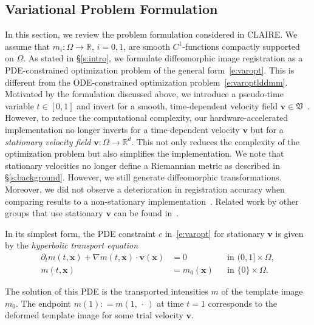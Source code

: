 \documentclass[11pt]{amsart}
\newcommand{\secref}[1]{\S\ref{#1}}
\newcommand\fs[1]{\ensuremath{\mathfrak{#1}}}
\newcommand\igrad{\ensuremath{\nabla}}
\newcommand{\defeq}{\ensuremath{\mathrel{\mathop:}=}}
\renewcommand{\vec}[1]{\ensuremath{\boldsymbol{#1}}}
\begin{document}
\subsection{Variational Problem Formulation}\label{s:formulation}

In this section, we review the problem formulation considered in CLAIRE. We assume that $m_i : \Omega \to \mathbb{R}$, $i=0,1$, are smooth $C^1$-functions compactly supported on $\Omega$. As stated in \secref{s:intro}, we formulate diffeomorphic image registration as a PDE-constrained optimization problem of the general form~\eqref{e:varopt}. This is different from the ODE-constrained optimization problem~\eqref{e:varoptlddmm}. Motivated by the formulation discussed above, we introduce a pseudo-time variable $t \in [0,1]$ and invert for a smooth, time-dependent velocity field $\vec{v} \in \fs{V}$~\cite{Mang:2015a}. However, to reduce the computational complexity, our hardware-accelerated implementation no longer inverts for a time-dependent velocity $\vec{v}$ but for a \emph{stationary velocity field} $\vec{v} : \Omega \to \mathbb{R}^d$. This not only reduces the complexity of the optimization problem but also simplifies the implementation. We note that stationary velocities no longer define a Riemannian metric as described in \secref{s:background}. However, we still generate diffeomorphic transformations. Moreover, we did not observe a deterioration in registration accuracy when comparing results to a non-stationary implementation~\cite{Mang:2015a}. Related work by other groups that use stationary $\vec{v}$ can be found in~\cite{Arsigny:2006a,Ashburner:2007a,Hernandez:2009a,Lorenzi:2013a,Lorenzi:2013b,Vercauteren:2009a}.

In its simplest form, the PDE constraint $c$ in~\eqref{e:varopt} for stationary $\vec{v}$ is given by the \emph{hyperbolic transport equation}
\begin{subequations}
\label{e:transport}
\begin{align}
\partial_t m(t,\vec{x}) + \igrad m(t,\vec{x}) \cdot \vec{v}(\vec{x})  & = 0
&& \text{in}\,\,(0,1] \times \Omega,
\\
m(t,\vec{x}) &=  m_0(\vec{x})
&& \text{in}\,\,\{0\} \times \Omega.
\end{align}
\end{subequations}

\noindent The solution of this PDE is the transported intensities $m$ of the template image $m_0$. The endpoint $m(1) \defeq m(1, \,\cdot\,)$ at time $t=1$ corresponds to the deformed template image for some trial velocity $\vec{v}$.
\end{document}
